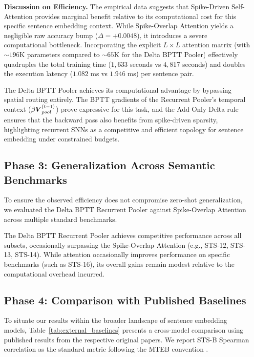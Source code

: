 \documentclass[10pt]{article} %
\begin{document}
\textbf{Discussion on Efficiency.} The empirical data suggests that Spike-Driven Self-Attention provides marginal benefit relative to its computational cost for this specific sentence embedding context. While Spike-Overlap Attention yields a negligible raw accuracy bump ($\Delta = +0.0048$), it introduces a severe computational bottleneck. Incorporating the explicit $L \times L$ attention matrix (with $\sim 196$K parameters compared to $\sim 65$K for the Delta BPTT Pooler) effectively quadruples the total training time ($1{,}633$ seconds vs $4{,}817$ seconds) and doubles the execution latency ($1.082$ ms vs $1.946$ ms) per sentence pair.

The Delta BPTT Pooler achieves its computational advantage by bypassing spatial routing entirely. The BPTT gradients of the Recurrent Pooler's temporal context ($\beta \boldsymbol{V}_{pool}^{(t-1)}$) prove expressive for this task, and the Add-Only Delta rule ensures that the backward pass also benefits from spike-driven sparsity, highlighting recurrent SNNs as a competitive and efficient topology for sentence embedding under constrained budgets.

\subsection{Phase 3: Generalization Across Semantic Benchmarks}
To ensure the observed efficiency does not compromise zero-shot generalization, we evaluated the Delta BPTT Recurrent Pooler against Spike-Overlap Attention across multiple standard benchmarks.

The Delta BPTT Recurrent Pooler achieves competitive performance across all subsets, occasionally surpassing the Spike-Overlap Attention (e.g., STS-12, STS-13, STS-14). While attention occasionally improves performance on specific benchmarks (such as STS-16), its overall gains remain modest relative to the computational overhead incurred.

\subsection{Phase 4: Comparison with Published Baselines}
To situate our results within the broader landscape of sentence embedding models, Table~\ref{tab:external_baselines} presents a cross-model comparison using published results from the respective original papers. We report STS-B Spearman correlation as the standard metric following the MTEB convention \citep{muennighoff2022mteb}.
\end{document}
